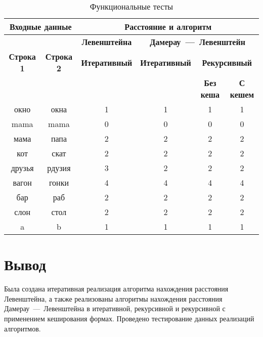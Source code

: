 \begin{table}[ht]
	\small
	\begin{center}
		\begin{threeparttable}
			\caption{Функциональные тесты}
			\label{tbl:func_tests}
			\begin{tabular}{|c|c|c|c|c|c|}
				\hline
				\multicolumn{2}{|c|}{\bfseries Входные данные}
				& \multicolumn{4}{c|}{\bfseries Расстояние и алгоритм} \\ 
				\hline 
				&
				& \multicolumn{1}{c|}{\bfseries Левенштейна} 
				& \multicolumn{3}{c|}{\bfseries Дамерау~---~Левенштейн} \\ \cline{3-6}
				
				\bfseries Строка 1 & \bfseries Строка 2 & \bfseries Итеративный & \bfseries Итеративный
				
				& \multicolumn{2}{c|}{\bfseries Рекурсивный} \\ \cline{5-6}
				& & & & \bfseries Без кеша & \bfseries С кешем \\
				\hline
				окно & окна & 1 & 1 & 1 & 1 \\
				\hline
				mama & mama & 0 & 0 & 0 & 0 \\
				\hline
				мама & папа & 2 & 2 & 2 & 2 \\
				\hline
				кот & скат & 2 & 2 & 2 & 2 \\
				\hline
				друзья & рдузия & 3 & 2 & 2 & 2 \\
				\hline
				вагон & гонки & 4 & 4 & 4 & 4 \\
				\hline
				бар & раб & 2 & 2 & 2 & 2 \\
				\hline
				слон & стол & 2 & 2 & 2 & 2 \\
				\hline
				a & b & 1 & 1 & 1 & 1 \\
				\hline
			\end{tabular}	
		\end{threeparttable}
	\end{center}
\end{table}

\section*{Вывод}
	Была создана итеративная реализация алгоритма нахождения расстояния Левенштейна, а также реализованы алгоритмы нахождения расстояния Дамерау~---~Левенштейна в итеративной, рекурсивной и рекурсивной с применением кеширования формах. Проведено тестирование данных реализаций алгоритмов.